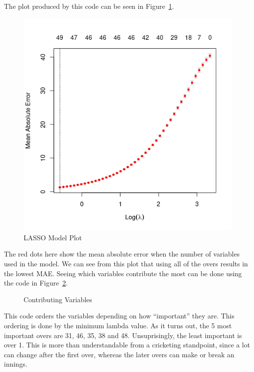 The plot produced by this code can be seen in Figure~\ref{lassoFig}.

\begin{figure}[h]
    \includegraphics[scale=0.4\linewidth]{figures/lasso.png}
    \caption{LASSO Model Plot}
    \label{lassoFig}
\end{figure}

The red dots here show the mean absolute error when the number of variables used in the model. We can see from this plot that using all of the overs results in the lowest MAE. Seeing which variables contribute the most can be done using the code in Figure~\ref{lassoVals}. 

\begin{figure}[h]
    
    \caption{Contributing Variables}
    \label{lassoVals}
\end{figure}

This code orders the variables depending on how ``important'' they are. This ordering is done by the minimum lambda value. As it turns out, the 5 most important overs are 31, 46, 35, 38 and 48. Unsuprisingly, the least important is over 1. This is more than understandable from a cricketing standpoint, since a lot can change after the first over, whereas the later overs can make or break an innings. 

